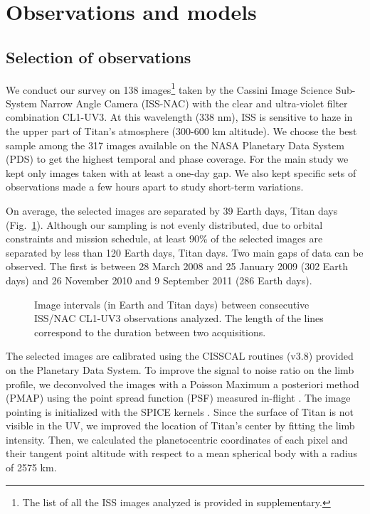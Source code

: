 \section{Observations and models}

\subsection{Selection of observations}
We conduct our survey on 138 images\footnote{The list of all the ISS images analyzed is provided in supplementary.} taken by the Cassini Image Science Sub-System Narrow Angle Camera (ISS-NAC) with the
clear and ultra-violet filter combination CL1-UV3. At this wavelength (338 nm), ISS is sensitive to haze in the
upper part of Titan's atmosphere (300-600 km altitude). We choose the best sample among the 317 images available on the NASA Planetary Data System (PDS)
to get the highest temporal and phase coverage. For the main study we kept only images taken with at least a one-day gap.
We also kept specific sets of observations made a few hours apart to study short-term variations.

On average, the selected images are separated by 39 Earth days,  Titan days (Fig.~\ref{fig:img_sampling}).
Although our sampling is not evenly distributed, due to orbital constraints and mission schedule, at least 90\% of the selected
images are separated by less than 120 Earth days,  Titan days. Two main gaps of data can be observed.
The first is between 28 March 2008 and 25 January 2009 (302 Earth days) and 26 November 2010 and 9 September 2011 (286 Earth days).

\begin{figure}[ht!]
\caption{Image intervals (in Earth and Titan days) between consecutive ISS/NAC CL1-UV3 observations analyzed.
The length of the lines correspond to the duration between two acquisitions.}
\label{fig:img_sampling}
\end{figure}

The selected images are calibrated using the CISSCAL routines (v3.8) provided on the Planetary Data System. To improve
the signal to noise ratio on the limb profile, we deconvolved the images with a Poisson Maximum a posteriori method
(PMAP) using the point spread function (PSF) measured in-flight \citep{West2010}. The image pointing is
initialized with the SPICE kernels \citep{Acton1996, Annex2017}. Since the surface of Titan is not visible in the UV, we improved
the location of Titan's center by fitting the limb intensity. Then, we calculated the planetocentric coordinates of each
pixel and their tangent point altitude with respect to a mean spherical body with a radius of 2575 km.

